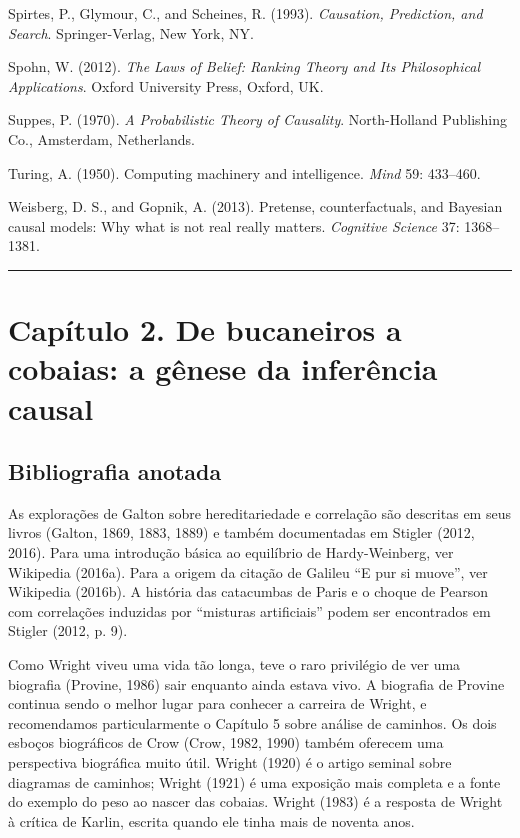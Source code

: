 \documentclass[11pt,a5paper,twoside]{book}
\begin{document}
Spirtes, P., Glymour, C., and Scheines, R. (1993). \textit{Causation, Prediction, and Search}. Springer-Verlag, New York, NY.

Spohn, W. (2012). \textit{The Laws of Belief: Ranking Theory and Its Philosophical Applications}. Oxford University Press, Oxford, UK.

Suppes, P. (1970). \textit{A Probabilistic Theory of Causality}. North-Holland Publishing Co., Amsterdam, Netherlands.

Turing, A. (1950). Computing machinery and intelligence. \textit{Mind} 59: 433–460.

Weisberg, D. S., and Gopnik, A. (2013). Pretense, counterfactuals, and Bayesian causal models: Why what is not real really matters. \textit{Cognitive Science} 37: 1368–1381.

\vspace{1em}\hrule\vspace{1em}
\section{Capítulo 2. De bucaneiros a cobaias: a gênese da inferência causal}
\subsection{Bibliografia anotada}
As explorações de Galton sobre hereditariedade e correlação são descritas em seus livros (Galton, 1869, 1883, 1889) e também documentadas em Stigler (2012, 2016). Para uma introdução básica ao equilíbrio de Hardy-Weinberg, ver Wikipedia (2016a). Para a origem da citação de Galileu “E pur si muove”, ver Wikipedia (2016b). A história das catacumbas de Paris e o choque de Pearson com correlações induzidas por “misturas artificiais” podem ser encontrados em Stigler (2012, p. 9).

Como Wright viveu uma vida tão longa, teve o raro privilégio de ver uma biografia (Provine, 1986) sair enquanto ainda estava vivo. A biografia de Provine continua sendo o melhor lugar para conhecer a carreira de Wright, e recomendamos particularmente o Capítulo 5 sobre análise de caminhos. Os dois esboços biográficos de Crow (Crow, 1982, 1990) também oferecem uma perspectiva biográfica muito útil. Wright (1920) é o artigo seminal sobre diagramas de caminhos; Wright (1921) é uma exposição mais completa e a fonte do exemplo do peso ao nascer das cobaias. Wright (1983) é a resposta de Wright à crítica de Karlin, escrita quando ele tinha mais de noventa anos.
\end{document}
